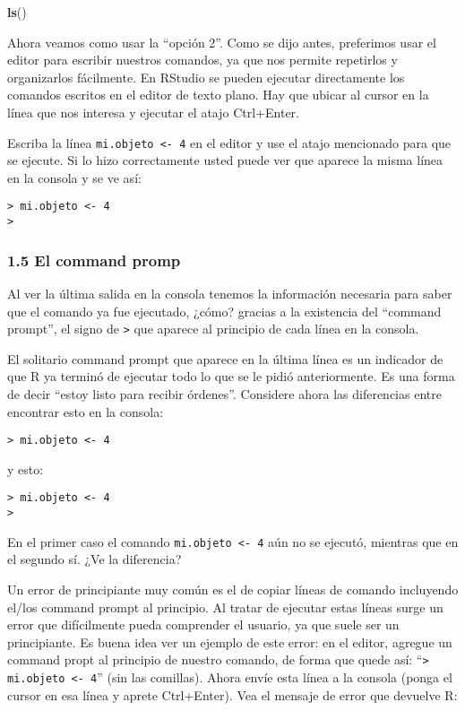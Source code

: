 \documentclass[]{article}
\newenvironment{Shaded}{}{}
\newcommand{\KeywordTok}[1]{\textcolor[rgb]{0.00,0.44,0.13}{\textbf{{#1}}}}
\newcommand{\NormalTok}[1]{{#1}}
\begin{document}
\begin{Shaded}
\begin{Highlighting}[]
\KeywordTok{ls}\NormalTok{()}
\end{Highlighting}
\end{Shaded}
Ahora veamos como usar la ``opción 2''. Como se dijo antes, preferimos
usar el editor para escribir nuestros comandos, ya que nos permite
repetirlos y organizarlos fácilmente. En RStudio se pueden ejecutar
directamente los comandos escritos en el editor de texto plano. Hay que
ubicar al cursor en la línea que nos interesa y ejecutar el atajo
Ctrl+Enter.

Escriba la línea \texttt{mi.objeto \textless{}- 4} en el editor y use el
atajo mencionado para que se ejecute. Si lo hizo correctamente usted
puede ver que aparece la misma línea en la consola y se ve así:

\begin{verbatim}
> mi.objeto <- 4
>
\end{verbatim}
\subsubsection{1.5 El command promp}

Al ver la última salida en la consola tenemos la información necesaria
para saber que el comando ya fue ejecutado, ¿cómo? gracias a la
existencia del ``command prompt'', el signo de \texttt{\textgreater{}}
que aparece al principio de cada línea en la consola.

El solitario command prompt que aparece en la última línea es un
indicador de que R ya terminó de ejecutar todo lo que se le pidió
anteriormente. Es una forma de decir ``estoy listo para recibir
órdenes''. Considere ahora las diferencias entre encontrar esto en la
consola:

\begin{verbatim}
> mi.objeto <- 4
\end{verbatim}
y esto:

\begin{verbatim}
> mi.objeto <- 4
>
\end{verbatim}
En el primer caso el comando \texttt{mi.objeto \textless{}- 4} aún no se
ejecutó, mientras que en el segundo sí. ¿Ve la diferencia?

Un error de principiante muy común es el de copiar líneas de comando
incluyendo el/los command prompt al principio. Al tratar de ejecutar
estas líneas surge un error que difícilmente pueda comprender el
usuario, ya que suele ser un principiante. Es buena idea ver un ejemplo
de este error: en el editor, agregue un command propt al principio de
nuestro comando, de forma que quede así:
``\texttt{\textgreater{} mi.objeto \textless{}- 4}'' (sin las comillas).
Ahora envíe esta línea a la consola (ponga el cursor en esa línea y
aprete Ctrl+Enter). Vea el mensaje de error que devuelve R:
\end{document}
